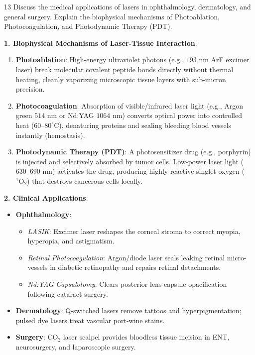 \begin{theoryq}{13}
Discuss the medical applications of lasers in ophthalmology, dermatology, and general surgery. Explain the biophysical mechanisms of Photoablation, Photocoagulation, and Photodynamic Therapy (PDT).
\end{theoryq}
\begin{theorysol}
\textbf{1. Biophysical Mechanisms of Laser-Tissue Interaction}:
\begin{enumerate}
    \item \textbf{Photoablation}: High-energy ultraviolet photons (e.g., $193\text{ nm}$ ArF excimer laser) break molecular covalent peptide bonds directly without thermal heating, cleanly vaporizing microscopic tissue layers with sub-micron precision.
    \item \textbf{Photocoagulation}: Absorption of visible/infrared laser light (e.g., Argon green $514\text{ nm}$ or Nd:YAG $1064\text{ nm}$) converts optical power into controlled heat ($60\text{--}80^\circ\text{C}$), denaturing proteins and sealing bleeding blood vessels instantly (hemostasis).
    \item \textbf{Photodynamic Therapy (PDT)}: A photosensitizer drug (e.g., porphyrin) is injected and selectively absorbed by tumor cells. Low-power laser light ($630\text{--}690\text{ nm}$) activates the drug, producing highly reactive singlet oxygen ($^1\text{O}_2$) that destroys cancerous cells locally.
\end{enumerate}

\textbf{2. Clinical Applications}:
\begin{itemize}
    \item \textbf{Ophthalmology}:
    \begin{itemize}
        \item \textit{LASIK}: Excimer laser reshapes the corneal stroma to correct myopia, hyperopia, and astigmatism.
        \item \textit{Retinal Photocoagulation}: Argon/diode laser seals leaking retinal micro-vessels in diabetic retinopathy and repairs retinal detachments.
        \item \textit{Nd:YAG Capsulotomy}: Clears posterior lens capsule opacification following cataract surgery.
    \end{itemize}
    \item \textbf{Dermatology}: Q-switched lasers remove tattoos and hyperpigmentation; pulsed dye lasers treat vascular port-wine stains.
    \item \textbf{Surgery}: $\text{CO}_2$ laser scalpel provides bloodless tissue incision in ENT, neurosurgery, and laparoscopic surgery.
\end{itemize}

\end{theorysol}
\vspace{4mm}

